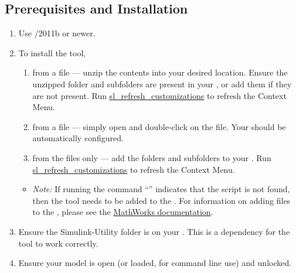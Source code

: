 \documentclass{article}
\begin{document}
\subsection{Prerequisites and Installation}

\begin{enumerate}
	\item Use \Matlab/\Simulink 2011b or newer.
	\item To install the tool,
	\begin{enumerate}
		\item from a  file --- unzip the contents into your desired location. Ensure the unzipped folder and subfolders are present in your \mpath, or add them if they are not present. Run \href{https://www.mathworks.com/help/simulink/ug/registering-customizations.html}{sl\_refresh\_customizations} to refresh the Context Menu. 
		\item from a  file --- simply open \Matlab and double-click on the file. Your \mpath should be automatically configured.
		\item from the files only --- add the folders and subfolders to your \mpath. Run \href{https://www.mathworks.com/help/simulink/ug/registering-customizations.html}{sl\_refresh\_customizations} to refresh the Context Menu.
	\end{enumerate}
	\begin{itemize}
		\item \textit{Note:} If running the command ``'' indicates that the script is not found, then the tool needs to be added to the \mpath.
		For information on adding files to the \mpath, please see the \href{https://www.mathworks.com/help/matlab/matlab_env/add-remove-or-reorder-folders-on-the-search-path.html}{MathWorks documentation}.
	\end{itemize}
	\item Ensure the Simulink-Utility folder is on your \mpath. This is a dependency for the tool to work correctly.
	\item Ensure your model is open (or loaded, for command line use) and unlocked.
\end{enumerate}

\end{document}
